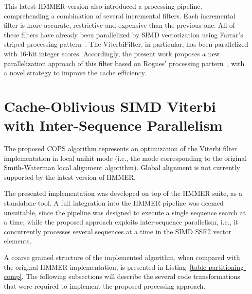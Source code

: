 \documentclass{bmcart}
\begin{document}
This latest HMMER version also introduced a processing pipeline, comprehending a combination of several incremental filters. Each incremental filter is more accurate, restrictive and expensive than the previous one. All of these filters have already been parallelized by \ac{SIMD} vectorization using Farrar's striped processing pattern~\cite{farrar}. The ViterbiFilter, in particular, has been parallelized with 16-bit integer scores. Accordingly, the present work proposes a new parallelization approach of this filter based on Rognes' processing pattern~\cite{rognes}, with a novel strategy to improve the cache efficiency.



\section*{Cache-Oblivious SIMD Viterbi with Inter-Sequence Parallelism}

The proposed \ac{COPS} algorithm represents an optimization of the Viterbi filter implementation in local unihit mode (i.e., the mode corresponding to the original Smith-Waterman local alignment algorithm). Global alignment is not currently supported by the latest version of HMMER.

The presented implementation was developed on top of the HMMER suite, as a standalone tool. A full integration into the HMMER pipeline was deemed unsuitable, since the pipeline was designed to execute a single sequence search at a time, while the proposed approach exploits inter-sequence parallelism, i.e., it concurrently processes several sequences at a time in the \ac{SIMD} SSE2 vector elements.

A coarse grained structure of the implemented algorithm, when compared with the original HMMER implementation, is presented in Listing~\ref{table-partitioning-comp}. The following subsections will describe the several code transformations that were required to implement the proposed processing approach.
\end{document}
